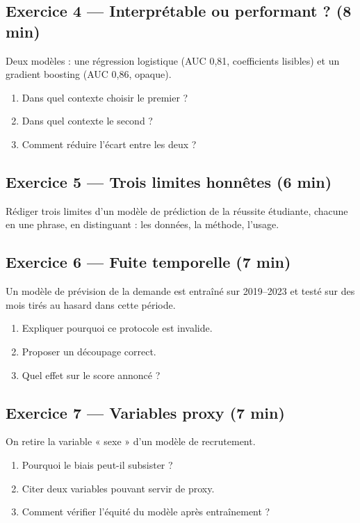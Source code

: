 \subsection*{Exercice 4 --- Interprétable ou performant ? \hfill \normalfont\footnotesize (8 min)}
Deux modèles : une régression logistique (AUC 0,81, coefficients lisibles) et
un gradient boosting (AUC 0,86, opaque).
\begin{enumerate}
  \item Dans quel contexte choisir le premier ?
  \item Dans quel contexte le second ?
  \item Comment réduire l'écart entre les deux ?
\end{enumerate}

\subsection*{Exercice 5 --- Trois limites honnêtes \hfill \normalfont\footnotesize (6 min)}
Rédiger trois limites d'un modèle de prédiction de la réussite étudiante,
chacune en une phrase, en distinguant : les données, la méthode, l'usage.


\subsection*{Exercice 6 --- Fuite temporelle \hfill \normalfont\footnotesize (7 min)}
Un modèle de prévision de la demande est entraîné sur 2019--2023 et testé sur
des mois tirés au hasard dans cette période.
\begin{enumerate}
  \item Expliquer pourquoi ce protocole est invalide.
  \item Proposer un découpage correct.
  \item Quel effet sur le score annoncé ?
\end{enumerate}

\subsection*{Exercice 7 --- Variables proxy \hfill \normalfont\footnotesize (7 min)}
On retire la variable « sexe » d'un modèle de recrutement.
\begin{enumerate}
  \item Pourquoi le biais peut-il subsister ?
  \item Citer deux variables pouvant servir de proxy.
  \item Comment vérifier l'équité du modèle après entraînement ?
\end{enumerate}

